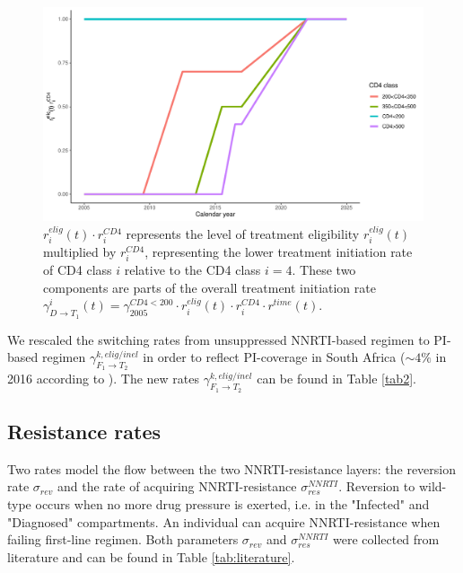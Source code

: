 \documentclass{article}
\begin{document}
\begin{figure}[h]
   \includegraphics[width=16cm]{../figures/dtg_treatrate.pdf}
\caption{$r^{elig}_i(t) \cdot r^{CD4}_i$ represents the level of treatment eligibility $r^{elig}_i(t)$ multiplied by $r^{CD4}_i$, representing the lower treatment initiation rate of CD4 class $i$ relative to the CD4 class $i=4$. These two components are parts of the overall treatment initiation rate $\gamma_{D\rightarrow T_1}^i (t)=\gamma^{CD4<200}_{2005} \cdot r^{elig}_i(t) \cdot r^{CD4}_i \cdot r^{time}(t)$.}\label{fig_treatrate}
\end{figure}

We rescaled the switching rates from unsuppressed NNRTI-based regimen to PI-based regimen $\gamma_{F_1\rightarrow T_2}^{k,elig/inel}$ in order to reflect PI-coverage in South Africa ($\sim 4\%$ in 2016 according to \cite{Moorhouse2019}). The new rates $\gamma_{F_1\rightarrow T_2}^{k,elig/inel}$ can be found in Table \ref{tab2}.


\subsection{Resistance rates}
Two rates model the flow between the two NNRTI-resistance layers: the reversion rate $\sigma_{rev}$ and the rate of acquiring NNRTI-resistance $\sigma_{res}^{NNRTI}$. Reversion to wild-type occurs when no more drug pressure is exerted, i.e. in the "Infected" and "Diagnosed" compartments. An individual can acquire NNRTI-resistance when failing first-line regimen. Both parameters $\sigma_{rev}$ and $\sigma_{res}^{NNRTI}$ were collected from literature and can be found in Table \ref{tab:literature}.
\end{document}
